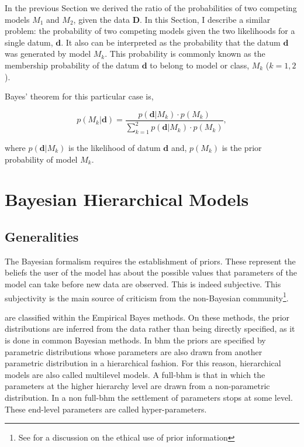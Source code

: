 In the previous Section we {derived} the ratio of the probabilities of two competing models $M_1$ and $M_2$, given the data $\mathbf{D}$. In this Section, I describe a similar problem: the probability of two competing models given the two likelihoods for a single datum, $\mathbf{d}$. It also can be interpreted as the probability that the datum $\mathbf{d}$ was generated by model $M_k$. This probability is commonly known as the membership probability of the datum $\mathbf{d}$ to belong to model or class, $M_k$ ($k=1,2$). 

Bayes' theorem for this particular case is,

\begin{equation}
\label{eq:prob}
p( M_k | \mathbf{d}) =\frac{p(\mathbf{d}|M_k)\cdot p(M_k)}{\sum_{k=1}^2 p(\mathbf{d}|M_k)\cdot p(M_k)},
\end{equation}

where $p(\mathbf{d}|M_k)$ is the likelihood of datum $\mathbf{d}$ and, $p(M_k)$ is the prior probability of model $M_k$.



\section{Bayesian Hierarchical Models}
\label{sect:BHM}
\subsection{Generalities}
\label{sect:generalities}
The Bayesian formalism requires the establishment of priors. These represent the beliefs the user of the model has about the possible values that parameters of the model can take {before new data are observed}. This is indeed subjective. This subjectivity is the main source of criticism from the non-Bayesian community\footnote{See \citet{Gelman2012} for a discussion on the ethical use of prior information}. 

 are classified within the Empirical Bayes methods. On these methods, the prior distributions are inferred from the data rather than being directly specified, as it is done in common Bayesian methods. In \gls{bhm} the priors are specified by parametric distributions whose parameters are also drawn from another parametric distribution in a hierarchical fashion. For this reason, hierarchical models are also called multilevel models. A full-\gls{bhm} is that in which the parameters at the higher hierarchy level are drawn from a non-parametric distribution. In a non full-\gls{bhm} the settlement of parameters stops at some level. These end-level parameters are called hyper-parameters.

